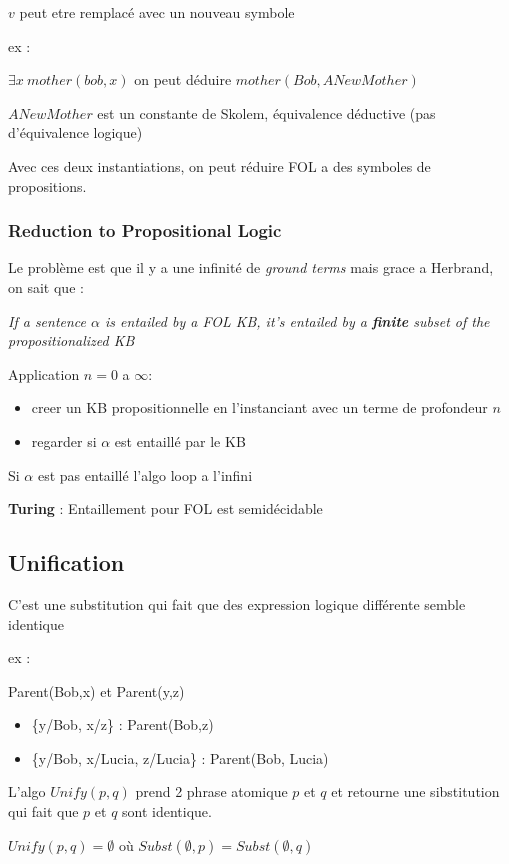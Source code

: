 \documentclass[12pt]{article}
\begin{document}
		$v$ peut etre remplacé avec un nouveau symbole
		
		ex :
		
		$\exists x  \ mother(bob,x)$ on peut déduire $mother(Bob, ANewMother)$
		
		$ANewMother$ est un constante de Skolem, équivalence déductive (pas d'équivalence logique)
		
		Avec ces deux instantiations, on peut réduire FOL a des symboles de propositions.
		
		\subsubsection{Reduction to Propositional Logic}	
			Le problème est que il y a une infinité de \textit{ground terms} mais grace a Herbrand, on sait que :
			
			\textit{If a sentence $\alpha$ is entailed by a FOL KB, it's entailed by a \textbf{finite} subset of the propositionalized KB}
			
			Application $n=0$ a $\infty$:
			\begin{itemize}
				\item creer un KB propositionnelle en l'instanciant avec un terme de profondeur $n$
				\item regarder si $\alpha$ est entaillé par le KB
			\end{itemize}
			
			Si $\alpha$ est pas entaillé l'algo loop a l'infini
			
			\textbf{Turing} : Entaillement pour FOL est semidécidable
			
	\subsection{Unification}
		C'est une substitution qui fait que des expression logique différente semble identique
		
		ex : 
		
		Parent(Bob,x) et Parent(y,z)
		\begin{itemize}
			\item \{y/Bob, x/z\} : Parent(Bob,z)
			\item \{y/Bob, x/Lucia, z/Lucia\} : Parent(Bob, Lucia)
		\end{itemize}	
		
		L'algo $Unify(p,q)$ prend 2 phrase atomique $p$ et $q$ et retourne une sibstitution qui fait que $p$ et $q$ sont identique.
		
		$Unify(p,q) = \emptyset$ où $Subst(\emptyset, p) = Subst(\emptyset, q)$
		
\end{document}

